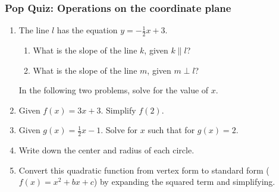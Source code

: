 \documentclass[12pt, twoside]{article}
\begin{document}
\subsubsection*{Pop Quiz: Operations on the coordinate plane}
  \begin{enumerate}

  \item The line $l$ has the equation $y=-\frac{1}{2} x+3$.
    \begin{enumerate}
      \item What is the slope of the line $k$, given $k \parallel l$?
      \vspace{1.3cm}
      \item What is the slope of the line $m$, given $m \perp l$?
      \vspace{1.3cm}
    \end{enumerate}

  In the following two problems, solve for the value of $x$.
      \vspace{4cm}

  \item Given $f(x)=3x+3$. Simplify $f(2)$. \vspace{2.5cm}
  \item Given $g(x)=\frac{1}{2} x-1$. Solve for $x$ such that for $g(x)=2$. \vspace{4cm}


  \item Write down the center and radius of each circle.
    \begin{enumerate}
    \end{enumerate}

\newpage

  \item Convert this quadratic function from vertex form to standard form ($f(x)=x^2+bx+c$) by expanding the squared term and simplifying.


\end{enumerate}
\end{document}
